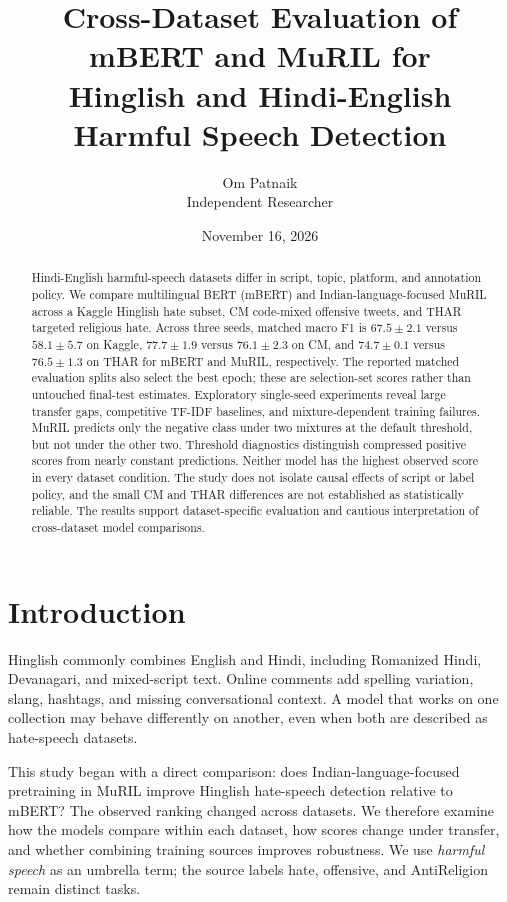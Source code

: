 \documentclass[11pt,a4paper]{article}
\title{Cross-Dataset Evaluation of mBERT and MuRIL for\\
Hinglish and Hindi-English Harmful Speech Detection}
\author{Om Patnaik\\\small Independent Researcher}
\date{November 16, 2026}
\begin{document}
\maketitle

\begin{abstract}
Hindi-English harmful-speech datasets differ in script, topic, platform,
and annotation policy. We compare multilingual BERT (mBERT) and
Indian-language-focused MuRIL across a Kaggle Hinglish hate subset,
CM code-mixed offensive tweets, and THAR targeted religious hate.
Across three seeds, matched macro F1 is $67.5\pm2.1$ versus $58.1\pm5.7$
on Kaggle, $77.7\pm1.9$ versus $76.1\pm2.3$ on CM, and $74.7\pm0.1$
versus $76.5\pm1.3$ on THAR for mBERT and MuRIL, respectively.
The reported matched evaluation splits also select the best epoch;
these are selection-set scores rather than untouched final-test estimates.
Exploratory single-seed experiments reveal large transfer gaps,
competitive TF-IDF baselines, and mixture-dependent training failures.
MuRIL predicts only the negative class under two mixtures at the default
threshold, but not under the other two. Threshold diagnostics distinguish
compressed positive scores from nearly constant predictions.
Neither model has the highest observed score in every dataset condition.
The study does not isolate causal effects of script or label policy,
and the small CM and THAR differences are not established as statistically
reliable. The results support dataset-specific evaluation and cautious
interpretation of cross-dataset model comparisons.
\end{abstract}

\section{Introduction}
Hinglish commonly combines English and Hindi, including Romanized Hindi,
Devanagari, and mixed-script text. Online comments add spelling variation,
slang, hashtags, and missing conversational context. A model that works on
one collection may behave differently on another, even when both
are described as hate-speech datasets.

This study began with a direct comparison: does Indian-language-focused
pretraining in MuRIL improve Hinglish hate-speech detection relative to
mBERT? The observed ranking changed across datasets. We therefore examine
how the models compare within each dataset, how scores change under
transfer, and whether combining training sources improves robustness.
We use \emph{harmful speech} as an umbrella term; the source labels hate,
offensive, and AntiReligion remain distinct tasks.
\end{document}
